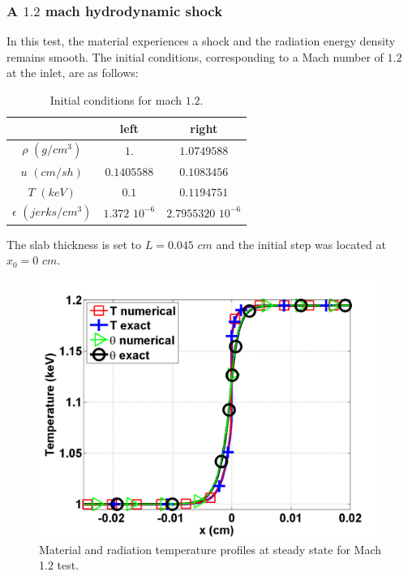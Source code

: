 \subsubsection{A $1.2$ mach hydrodynamic shock}

In this test, the material experiences a shock and the radiation energy density remains smooth. The initial conditions, corresponding to a Mach number of $1.2$ at the inlet, are as follows: 
\begin{table}[H]
\caption{\label{tbl:table4} Initial conditions for mach $1.2$.}
\begin{center}
\begin{tabular}{|c|c|c|}
\hline 
 & left  & right \\ \hline
$\rho$ $(g/cm^3)$ &$1.$ & $1.0749588$ \\ \hline
$u$ $(cm/sh)$& $0.1405588$ & $0.1083456$ \\ \hline
$T$ $(keV)$& $0.1$ & $0.1194751$\\ \hline
$\epsilon$ $(jerks/cm^3)$ & $1.372$ $10^{-6}$ & $2.7955320$ $10^{-6}$\\
\hline
\end{tabular}  
\end{center}  
\end{table}
The slab thickness is set to $L=0.045$ $cm$ and the initial step was located at $x_0 = 0$ $cm$. 
\begin{figure}[H]
       \centering
       \includegraphics[width=\textwidth]{figures/Mach_1p2_nel_1000_temperature.png}
       \caption{Material and radiation temperature profiles at steady state for Mach 1.2 test.}\label{fig:Mach12_temp}
\end{figure}
